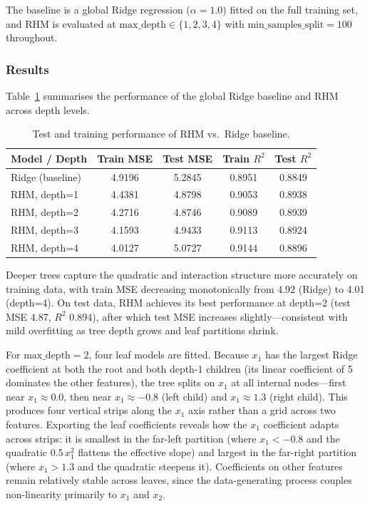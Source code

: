 \documentclass[11pt,a4paper]{article}
\begin{document}
The baseline is a global Ridge regression ($\alpha = 1.0$) fitted on the full training set, and RHM is evaluated at $\text{max\_depth} \in \{1, 2, 3, 4\}$ with $\text{min\_samples\_split} = 100$ throughout.

\subsubsection{Results}

Table~\ref{tab:results} summarises the performance of the global Ridge baseline and RHM across depth levels.

\begin{table}[ht]
\centering
\caption{Test and training performance of RHM vs.\ Ridge baseline.}\label{tab:results}
\begin{tabular}{lcccc}
\toprule
\textbf{Model / Depth} & \textbf{Train MSE} & \textbf{Test MSE} & \textbf{Train $R^2$} & \textbf{Test $R^2$} \\
\midrule
Ridge (baseline) & 4.9196 & 5.2845 & 0.8951 & 0.8849 \\
RHM, depth=1     & 4.4381 & 4.8798 & 0.9053 & 0.8938 \\
RHM, depth=2     & 4.2716 & 4.8746 & 0.9089 & 0.8939 \\
RHM, depth=3     & 4.1593 & 4.9433 & 0.9113 & 0.8924 \\
RHM, depth=4     & 4.0127 & 5.0727 & 0.9144 & 0.8896 \\
\bottomrule
\end{tabular}
\end{table}

Deeper trees capture the quadratic and interaction structure more accurately on training data, with train MSE decreasing monotonically from 4.92 (Ridge) to 4.01 (depth=4). On test data, RHM achieves its best performance at depth=2 (test MSE 4.87, $R^2$ 0.894), after which test MSE increases slightly---consistent with mild overfitting as tree depth grows and leaf partitions shrink.

For $\text{max\_depth} = 2$, four leaf models are fitted. Because $x_1$ has the largest Ridge coefficient at both the root and both depth-1 children (its linear coefficient of 5 dominates the other features), the tree splits on $x_1$ at all internal nodes---first near $x_1 \approx 0.0$, then near $x_1 \approx -0.8$ (left child) and $x_1 \approx 1.3$ (right child). This produces four vertical strips along the $x_1$ axis rather than a grid across two features. Exporting the leaf coefficients reveals how the $x_1$ coefficient adapts across strips: it is smallest in the far-left partition (where $x_1 < -0.8$ and the quadratic $0.5\,x_1^2$ flattens the effective slope) and largest in the far-right partition (where $x_1 > 1.3$ and the quadratic steepens it). Coefficients on other features remain relatively stable across leaves, since the data-generating process couples non-linearity primarily to $x_1$ and $x_2$.
\end{document}
